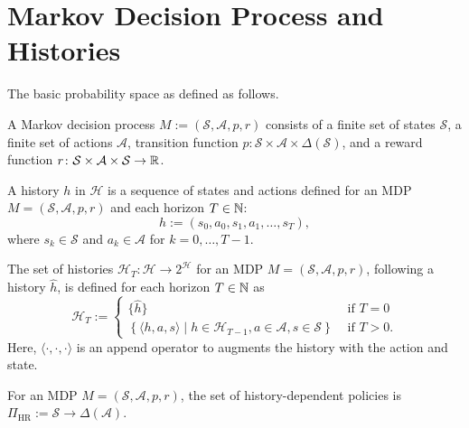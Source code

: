 \section{Markov Decision Process and Histories}

The basic probability space as defined as follows.
\begin{definition}
  A Markov decision process $M := (\mathcal{S}, \mathcal{A}, p, r)$ consists of a finite set of states $\mathcal{S}$, a finite set of actions $\mathcal{A}$, transition function $p\colon \mathcal{S} \times \mathcal{A} \times \Delta(\mathcal{S})$, and a reward function $r \colon \mathcal{S} \times \mathcal{A} \times \mathcal{S} \to \mathbb{R}$.
  \leanok
\end{definition}

\begin{definition}[History]
  A history $h$ in $\mathcal{H}$ is a sequence of states and actions defined for an MDP $M = (\mathcal{S}, \mathcal{A}, p, r)$ and each horizon $T \in \mathbb{N}$:
  \[
    h := (s_0, a_0, s_1, a_1, \dots , s_T),
  \]
  where $s_k \in \mathcal{S}$ and $a_k\in \mathcal{A}$ for $k = 0, \dots , T-1$.
  \leanok
\end{definition}

\begin{definition}[Histories]
  The set of histories $\mathcal{H}_T \colon  \mathcal{H} \to 2^{\mathcal{H}}$ for an MDP $M = (\mathcal{S}, \mathcal{A}, p, r)$, following a history $\hat{h}$, is defined for each horizon $T \in \mathbb{N}$ as
  \[
    \mathcal{H}_T :=
    \begin{cases}
        \{ \hat{h} \} &\text{ if } T = 0 \\      
        \left\{ \langle h, a, s \rangle \mid h \in \mathcal{H}_{T-1}, a\in \mathcal{A}, s\in \mathcal{S} \right\} &\text{ if } T > 0.
    \end{cases}
  \]
  Here, $\langle \cdot , \cdot , \cdot  \rangle$ is an append operator to augments the history with the action and state.
  \leanok
\end{definition}

\begin{definition}
  For an MDP $M = (\mathcal{S}, \mathcal{A}, p, r)$, the set of history-dependent policies is $\Pi_{\mathrm{HR}} := \mathcal{S} \to \Delta(\mathcal{A})$.
  \leanok
\end{definition}

